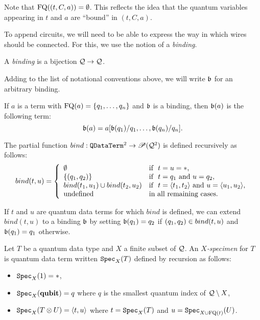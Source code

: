 \documentclass[twoside]{article}
\begin{document}
Note that $\mathop{\textrm{FQ}}\nolimits((t,C,a))=\emptyset$. This reflects the idea that the 
quantum variables appearing in $t$ and $a$ are ``bound'' in $(t,C,a)$. 

To append circuits, we will need to be able to express the way in 
which wires should be connected. For this, we use the notion of a 
\emph{binding}.

\begin{definition}
A \emph{binding} is a bijection $\mathcal{Q}\to \mathcal{Q}$.
\end{definition}


Adding to the list of notational conventions above, we will write 
$\mathfrak{b}$ for an arbitrary binding. 

\begin{definition}
If $a$ is a term with $\mathop{\textrm{FQ}}\nolimits(a)=\{q_1,\ldots,q_n\}$ and $\mathfrak{b}$ is 
a binding, then $\mathfrak{b}(a)$ is the following term:
\[
\mathfrak{b}(a)= a[\mathfrak{b}(q_1)/q_1,\ldots ,\mathfrak{b}(q_n)/q_n].
\]
\end{definition}

\begin{definition}
The partial function $bind: \texttt{QDataTerm}^2\to {\mathscr{P}} (\mathcal{Q}^2)$ is 
defined recursively as follows:
\[
bind (t,u)= \left\{
  \begin{array}{ll}
    \emptyset & \mbox{if}~~ t=u=*, \\
    \{(q_1,q_2)\} & \mbox{if}~~ t=q_1 \mbox{ and } u=q_2, \\        
    bind (t_1,u_1) \cup bind (t_2,u_2) & 
      \mbox{if}~~ t=\langle t_1,t_2\rangle \mbox{ and } u=\langle u_1,u_2\rangle, \\
    \mbox{undefined} & \mbox{in all remaining cases.}
  \end{array}
\right.
\]
\end{definition}

\begin{remark}
\label{bind_extension}
If $t$ and $u$ are quantum data terms for which $bind$ is defined, we 
can extend $bind(t,u)$ to a binding $\mathfrak{b}$ by setting 
$\mathfrak{b} (q_1) = q_2$ if $(q_1,q_2)\in bind (t,u)$ and 
$\mathfrak{b} (q_1) = q_1$ otherwise.
\end{remark}

\begin{definition}
Let $T$ be a quantum data type and $X$ a finite subset of $\mathcal{Q}$. 
An \emph{$X$-specimen} for $T$ is quantum data term written $\texttt{Spec}_X(T)$ 
defined by recursion as follows:
\begin{itemize}
  \item $\texttt{Spec}_X(1)=*$,
  \item $\texttt{Spec}_X(\textrm{\bf qubit})=q$ where $q$ is the smallest quantum 
  index of $\mathcal{Q}\setminus X$,
  \item $\texttt{Spec}_X(T\otimes U)=\langle t,u\rangle$ where $t=\texttt{Spec}_X(T)$ 
  and $u=\texttt{Spec}_{X\cup \mathop{\textrm{FQ}}\nolimits(t)}(U)$.  
\end{itemize}
\end{definition}
\end{document}
